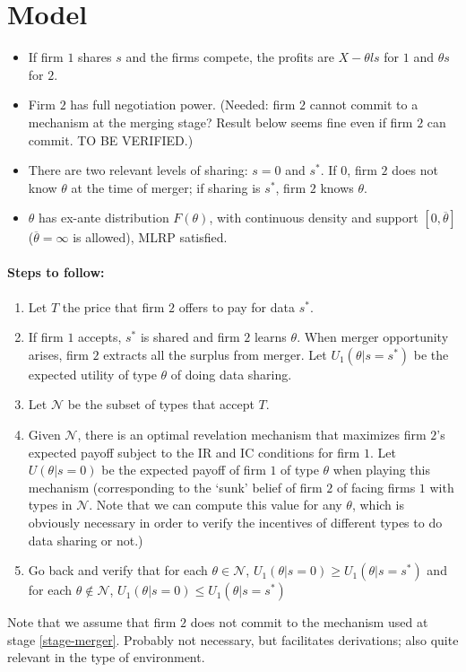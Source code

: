 \documentclass[a4paper]{article}
\newcommand{\N}{\mathcal N}
\renewcommand{\t}{\theta}
\begin{document}
\section{Model}
\begin{itemize}
  \item If firm $1$ shares $s$ and the firms compete, the profits are $X-\t l s$ for $1$ and $\t s$ for $2$.
  \item Firm $2$ has full negotiation power. (Needed: firm $2$ cannot commit to a mechanism at the merging stage? Result below seems fine even if firm $2$ can commit. TO BE VERIFIED.) 
  \item There are two relevant levels of sharing: $s=0$ and $s^*$. If $0$, firm $2$ does not know $\t$ at the time of merger; if sharing is $s^*$, firm $2$ knows $\t$.
  \item $\t$ has ex-ante distribution $F(\t)$, with continuous density and support $[0,\overline \t]$ ($\overline \t=\infty$ is allowed), MLRP satisfied.
\end{itemize}


\paragraph{Steps to follow:}
\begin{enumerate}[(1)]\setlength\itemsep{0em}
  \item Let $T$ the price that firm $2$ offers to pay for data $s^*$.
  \item If firm $1$ accepts, $s^*$ is shared and firm $2$ learns $\t$. When merger opportunity arises, firm $2$ extracts all the surplus from merger. Let $U_1(\t|s=s^*)$ be the expected utility of type $\t$ of doing data sharing.
  \item Let $\N$ be the subset of types that accept $T$.
  \item\label{stage-merger} Given $\N$, there is an optimal revelation mechanism that maximizes firm $2$'s expected payoff subject to the IR and IC conditions for firm $1$. Let $U(\t|s=0)$ be the expected payoff of firm $1$ of type $\t$ when playing this mechanism (corresponding to the `sunk' belief of firm $2$ of facing firms $1$ with types in $\N$. Note that we can compute this value for any $\t$, which is obviously necessary in order to verify the incentives of different types to do data sharing or not.)
  \item Go back and verify that for each $\t\in \N$, $U_1(\t|s=0)\geq U_1(\t|s=s^*)$ and for each $\t\notin \N$, $U_1(\t|s=0)\leq U_1(\t|s=s^*)$
\end{enumerate}
%
Note that we assume that firm $2$ does not commit to the mechanism used at stage \eqref{stage-merger}. Probably not necessary, but facilitates derivations; also quite relevant in the \cite{anton2002sale} type of environment.
\end{document}
